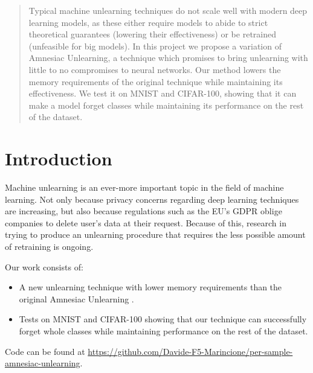 \documentclass{article}
\begin{document}

\printAffiliationsAndNotice{}

\begin{abstract}
Typical machine unlearning techniques do not scale well with modern deep learning models, as these either require models to abide to strict theoretical guarantees (lowering their effectiveness) or be retrained (unfeasible for big models). In this project we propose a variation of Amnesiac Unlearning, a technique which promises to bring unlearning with little to no compromises to neural networks. Our method lowers the memory requirements of the original technique while maintaining its effectiveness. We test it on MNIST and CIFAR-100, showing that it can make a model forget classes while maintaining its performance on the rest of the dataset.
\end{abstract}
\section{Introduction}
Machine unlearning is an ever-more important topic in the field of machine learning. Not only because privacy concerns regarding deep learning techniques are increasing, but also because regulations such as the EU's GDPR oblige companies to delete user's data at their request. Because of this, research in trying to produce an unlearning procedure that requires the less possible amount of retraining is ongoing.

Our work consists of:
\begin{itemize}
    \item A new unlearning technique with lower memory requirements than the original Amnesiac Unlearning \cite{graves2021amnesiac}.
    \item Tests on MNIST and CIFAR-100 showing that our technique can successfully forget whole classes while maintaining performance on the rest of the dataset.
\end{itemize}
Code can be found at \url{https://github.com/Davide-F5-Marincione/per-sample-amnesiac-unlearning}.
\end{document}
